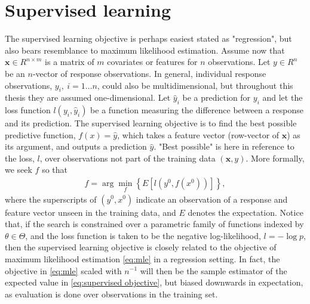 \section{Supervised learning}

The supervised learning objective is perhaps easiest stated as "regression", but also bears resemblance to maximum likelihood estimation.
Assume now that $\mathbf{x}\in R^{n\times m}$ is a matrix of $m$ covariates or features for $n$ observations. Let $y\in R^n$ be an $n$-vector of response observations.
In general, individual response observations, $y_i,~i=1\dots n$, could also be multidimensional, but throughout this thesis they are assumed one-dimensional.
Let $\hat{y}_i$ be a prediction for $y_i$ and let the loss function $l(y_i,\hat{y}_i)$ be a function measuring the difference between a response and its prediction.
The supervised learning objective is to find the best possible predictive function, $f(x)=\hat{y}$, which takes a feature vector (row-vector of $\mathbf{x}$) as its argument, and outputs a prediction $\hat{y}$. "Best possible" is here in reference to the loss, $l$, over observations not part of the training data $(\mathbf{x},y)$.
More formally, we seek $f$ so that
\begin{align}\label{eq:supervised objective}
	\hat{f} = \arg\min_f \left\{ E\left[l(y^0, f(x^0))\right] \right\},
\end{align} 
where the superscripts of $(y^0, x^0)$ indicate an observation of a response and feature vector unseen in the training data, and $E$ denotes the expectation.
Notice that, if the search is constrained over a parametric family of functions indexed by $\theta\in\Theta$, and the loss function is taken to be the negative log-likelihood, $l=-\log p$, then the supervised learning objective is closely related to the objective of maximum likelihood estimation \eqref{eq:mle} in a regression setting.
In fact, the objective in \eqref{eq:mle} scaled with $n^{-1}$ will then be the sample estimator of the expected value in \eqref{eq:supervised objective}, but biased downwards in expectation, as evaluation is done over observations in the training set.

